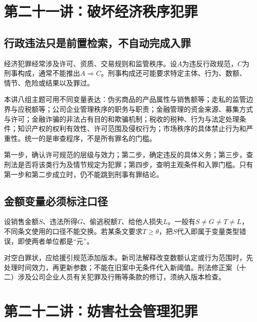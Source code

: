
\section{第二十一讲：破坏经济秩序犯罪}
\subsection{行政违法只是前置检索，不自动完成入罪}
经济犯罪经常涉及许可、资质、交易规则和监管秩序。设$A$为违反行政规范，$C$为刑事构成，通常不能推出$A\Rightarrow C$。刑事构成还可能要求特定主体、行为、数额、情节、危险或结果以及罪过。

本讲八组主题可用不同变量表达：伪劣商品的产品属性与销售额等；走私的监管边界与应税额等；公司企业管理秩序的职务与职责；金融管理的资金来源、募集方式与许可；金融诈骗的非法占有目的和欺骗机制；税收的税种、行为与法定处理条件；知识产权的权利有效性、许可范围及侵权行为；市场秩序的具体禁止行为和严重性。统一的是审查程序，不是所有罪名的门槛。

第一步，确认许可规范的层级与效力；第二步，确定违反的具体义务；第三步，查刑法是否将该类行为及情节规定为犯罪；第四步，查明主观条件和入罪门槛。只有第一步和第二步成立时，仍不能跳到刑事有罪结论。

\subsection{金额变量必须标注口径}
设销售金额$S$、违法所得$G$、偷逃税额$T$、给他人损失$L$。一般有$S\ne G\ne T\ne L$，不同条文使用的口径不能交换。若某条文要求$T\ge\theta$，把$S$代入即属于变量类型错误，即使两者单位都是“元”。

对空白罪状，应给援引规范添加版本。新司法解释改变数额认定或行为范围时，先处理时间效力，再更新参数；不能在旧案中无条件代入新阈值。刑法修正案（十二）涉及公司企业人员有关犯罪及行贿等条款的修订，须纳入版本检查。


\section{第二十二讲：妨害社会管理犯罪}

